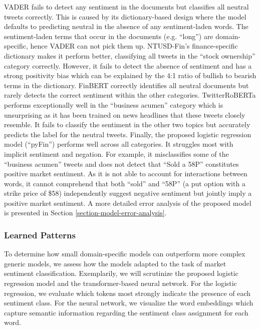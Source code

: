 

VADER fails to detect any sentiment in the documents but classifies all neutral tweets correctly. This is caused by its dictionary-based design where the model defaults to predicting neutral in the absence of any sentiment-laden words. The sentiment-laden terms that occur in the documents (e.g. ``long'') are domain-specific, hence VADER can not pick them up. NTUSD-Fin's finance-specific dictionary makes it perform better, classifying all tweets in the ``stock ownership'' category correctly. However, it fails to detect the absence of sentiment and has a strong positivity bias which can be explained by the 4:1 ratio of bullish to bearish terms in the dictionary. FinBERT correctly identifies all neutral documents but rarely detects the correct sentiment within the other categories. TwitterRoBERTa performs exceptionally well in the ``business acumen'' category which is unsurprising as it has been trained on news headlines that these tweets closely resemble. It fails to classify the sentiment in the other two topics but accurately predicts the label for the neutral tweets. Finally, the proposed logistic regression model (``pyFin'') performs well across all categories. It struggles most with implicit sentiment and negation. For example, it misclassifies some of the ``business acumen'' tweets and does not detect that ``Sold a 58P'' constitutes positive market sentiment. As it is not able to account for interactions between words, it cannot comprehend that both ``sold'' and ``58P'' (a put option with a strike price of \$58) independently suggest negative sentiment but jointly imply a positive market sentiment. A more detailed error analysis of the proposed model is presented in Section \ref{section-model-error-analysis}.


\subsubsection{Learned Patterns}
\label{section-learned-patterns}
To determine how small domain-specific models can outperform more complex generic models, we assess how the models adapted to the task of market sentiment classification. Exemplarily, we will scrutinize the proposed logistic regression model and the transformer-based neural network. For the logistic regression, we evaluate which tokens most strongly indicate the presence of each sentiment class. For the neural network, we visualize the word embeddings which capture semantic information regarding the sentiment class assignment for each word.

